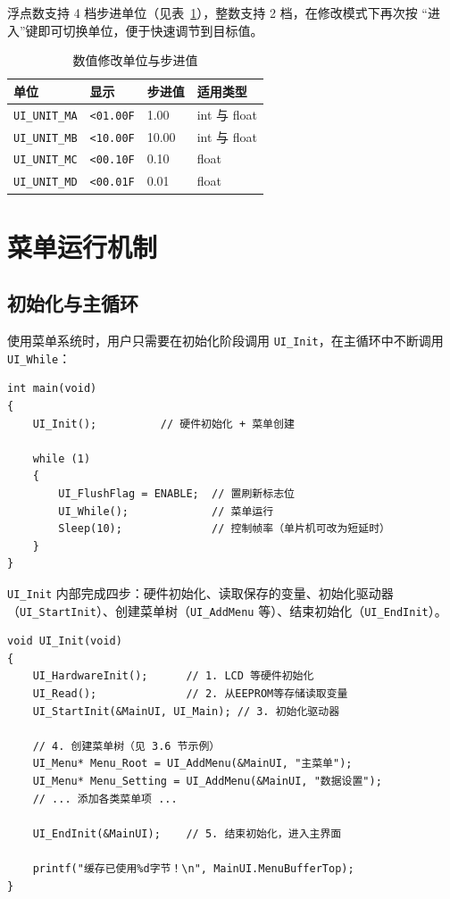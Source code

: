 浮点数支持 4 档步进单位（见表~\ref{tab:menu-unit}），整数支持 2 档，在修改模式下再次按 “进入”键即可切换单位，便于快速调节到目标值。

\begin{table}[htbp]
\centering \caption{数值修改单位与步进值} \label{tab:menu-unit}
    \begin{tabular}{llll}
        \toprule
        单位 & 显示 & 步进值 & 适用类型 \\
        \midrule
        \texttt{UI\_UNIT\_MA} & \texttt{<01.00F} & 1.00  & int 与 float \\
        \texttt{UI\_UNIT\_MB} & \texttt{<10.00F} & 10.00 & int 与 float \\
        \texttt{UI\_UNIT\_MC} & \texttt{<00.10F} & 0.10  & float \\
        \texttt{UI\_UNIT\_MD} & \texttt{<00.01F} & 0.01  & float \\
        \bottomrule
    \end{tabular}
\end{table}
\section{菜单运行机制}

\subsection{初始化与主循环}

使用菜单系统时，用户只需要在初始化阶段调用 \texttt{UI\_Init}，在主循环中不断调用 \texttt{UI\_While}：

\begin{lstlisting}[style=c]
int main(void)
{
    UI_Init();          // 硬件初始化 + 菜单创建

    while (1)
    {
        UI_FlushFlag = ENABLE;  // 置刷新标志位
        UI_While();             // 菜单运行
        Sleep(10);              // 控制帧率（单片机可改为短延时）
    }
}
\end{lstlisting}

\texttt{UI\_Init} 内部完成四步：硬件初始化、读取保存的变量、初始化驱动器（\texttt{UI\_StartInit}）、创建菜单树（\texttt{UI\_AddMenu} 等）、结束初始化（\texttt{UI\_EndInit}）。

\begin{lstlisting}[style=c]
void UI_Init(void)
{
    UI_HardwareInit();      // 1. LCD 等硬件初始化
    UI_Read();              // 2. 从EEPROM等存储读取变量
    UI_StartInit(&MainUI, UI_Main); // 3. 初始化驱动器

    // 4. 创建菜单树（见 3.6 节示例）
    UI_Menu* Menu_Root = UI_AddMenu(&MainUI, "主菜单");
    UI_Menu* Menu_Setting = UI_AddMenu(&MainUI, "数据设置");
    // ... 添加各类菜单项 ...

    UI_EndInit(&MainUI);    // 5. 结束初始化，进入主界面

    printf("缓存已使用%d字节！\n", MainUI.MenuBufferTop);
}
\end{lstlisting}

